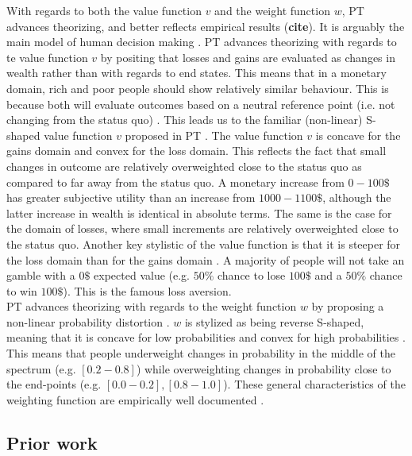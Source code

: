 \documentclass[12pt]{article}
\begin{document}
With regards to both the value function $v$ and
the weight function $w$,
PT \autocite{
	PT,
tversky1992advances} advances theorizing,
and better reflects empirical results (\textbf{cite}).
It is arguably the main model of human decision making
\autocite{newell2015straight}.
PT advances theorizing
with regards to te value function $v$
by positing that losses and
gains are evaluated as changes in wealth rather
than with regards to end states. This means that
in a monetary domain, rich and poor people
should show relatively similar
behaviour. This is because both will
evaluate outcomes based
on a neutral reference point (i.e. not
changing from the status quo)
\autocite{newell2015straight}.
This leads us to the familiar (non-linear) S-shaped
value function $v$ proposed in PT \autocite{PT}.
The value function $v$ is concave for the gains
domain and convex for the loss domain.
This reflects the
fact that small changes in outcome are relatively
overweighted close to the status quo as
compared to far away from the status quo.
A monetary increase from
$0 - 100\$$ has greater subjective utility
than an increase
from $1000 - 1100\$$, although the latter
increase in wealth is identical in absolute terms.
The same is the case for the
domain of losses, where small increments are
relatively overweighted close to the
status quo. Another key stylistic of the
value function is that it is steeper for the
loss domain than for the gains domain
\autocite{newell2015straight}.
A majority of people will not take an gamble
with a $0\$$ expected value (e.g.  $50\%$ chance
to lose  $100\$$ and a  $50\%$ chance to win
$100\$$). This is the famous loss aversion. \\

PT advances theorizing with regards to
the weight function $w$
by proposing a non-linear probability
distortion \autocite{PT}. $w$ is stylized as
being reverse S-shaped, meaning that it is
concave for low probabilities and convex for
high probabilities \autocite{gonzalez1999shape}.
This means that
people underweight changes in probability in
the middle of the spectrum (e.g. $[0.2-0.8]$)
while overweighting changes in probability close
to the end-points (e.g. $[0.0 - 0.2], [0.8 - 1.0]$).
These general characteristics of the weighting
function are empirically well documented
\autocite{tversky1992advances,
wu1996curvature}.

\subsection{Prior work}
\end{document}
